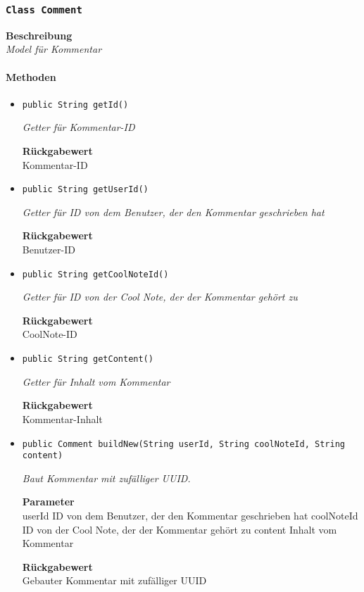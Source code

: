     \subsubsection{\texttt{Class Comment}}
    \textbf{Beschreibung} \\
    \textit{Model für Kommentar}
    \paragraph*{Methoden}
    \begin{itemize}
    	\item{\texttt{public String getId()}}
    	
    	\textit{Getter für Kommentar-ID}
    	
    	
    	
    	\textbf{Rückgabewert} \\
    	Kommentar-ID        \item{\texttt{public String getUserId()}}
    	
    	\textit{Getter für ID von dem Benutzer, der den Kommentar geschrieben hat}
    	
    	
    	
    	\textbf{Rückgabewert} \\
    	Benutzer-ID        \item{\texttt{public String getCoolNoteId()}}
    	
    	\textit{Getter für ID von der Cool Note, der der Kommentar gehört zu}
    	
    	
    	
    	\textbf{Rückgabewert} \\
    	CoolNote-ID        \item{\texttt{public String getContent()}}
    	
    	\textit{Getter für Inhalt vom Kommentar}
    	
    	
    	
    	\textbf{Rückgabewert} \\
    	Kommentar-Inhalt        \item{\texttt{public Comment buildNew(String userId, String coolNoteId, String content)}}
    	
    	\textit{Baut Kommentar mit zufälliger UUID.}
    	
    	\textbf{Parameter} \\
    	userId ID von dem Benutzer, der den Kommentar geschrieben hat
    	coolNoteId ID von der Cool Note, der der Kommentar gehört zu
    	content Inhalt vom Kommentar
    	
    	\textbf{Rückgabewert} \\
    	Gebauter Kommentar mit zufälliger UUID
    \end{itemize}
